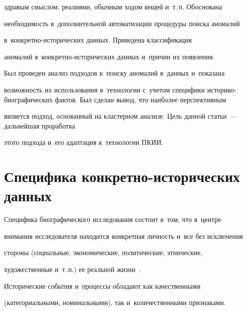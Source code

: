 здравым смыслом, реалиями, обычным ходом вещей и~т.\,п. Обоснована 


необходимость в~дополнительной автоматизации процедуры поиска аномалий  


в~кон\-крет\-но-ис\-то\-ри\-че\-ских данных. Приведена классификация 


аномалий в~кон\-крет\-но-ис\-то\-ри\-че\-ских данных и~причин их появления. 


Был проведен анализ подходов к~поиску аномалий в~данных и~показана 


возможность их использования в~технологии с~учетом специфики ис\-то\-ри\-ко-био\-гра\-фи\-че\-ских фактов. Был сделан вывод, что наиболее перспективным 


является подход, основанный на кластерном анализе.  Цель данной статьи~--- дальнейшая проработка 


этого подхода и~его адаптация к~технологии ПКИИ.


{





}





\vspace*{-6pt}





\section{Специфика конкретно-исторических данных}





\vspace*{-4pt}


  


  Специфика биографического исследования состоит в~том, что в~центре 


внимания исследователя находится конкретная личность и~все без исключения 


стороны (социальные, экономические, политические, этнические, 


художественные и~т.\,п.) ее реальной жизни~\cite{9-ad}.


  


  Исторические события и~процессы обладают как качественными 


(категориальными, номинальными), так и~количественными признаками. 


